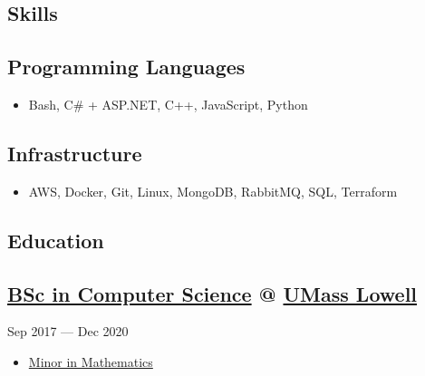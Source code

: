 \documentclass[11pt, letterpaper]{article}
\newcommand{\datedsubsection}[2]{
    \titleformat{\subsection}[runin]{\normalfont\normalsize\bfseries}{\thesection}{}{}
    \subsection*{#1}
    \hfill#2
    \titleformat{\subsection}[hang]{\normalfont\normalsize\bfseries}{\thesection}{}{}
}
\begin{document}

\textcolor{header}{\section*{Skills}}\label{sec:skills}

\subsection*{Programming Languages}
\begin{itemize}
    \item Bash, C\# + ASP.NET, C++, JavaScript, Python
\end{itemize}

\subsection*{Infrastructure}
\begin{itemize}
    \item AWS, Docker, Git, Linux, MongoDB, RabbitMQ, SQL, Terraform
\end{itemize}


\textcolor{header}{\section*{Education}}\label{sec:education}

\datedsubsection{\href{https://www.uml.edu/catalog/undergraduate/sciences/departments/computer-science/computer-science-major.aspx}{BSc in Computer Science} @ \href{https://www.uml.edu/}{UMass Lowell}}{Sep 2017 --- Dec 2020}
\begin{itemize}
    \item \href{https://www.uml.edu/catalog/undergraduate/sciences/departments/mathematical-sciences/mathematical-sciences-minor.aspx}{Minor in Mathematics}
\end{itemize}
\end{document}
